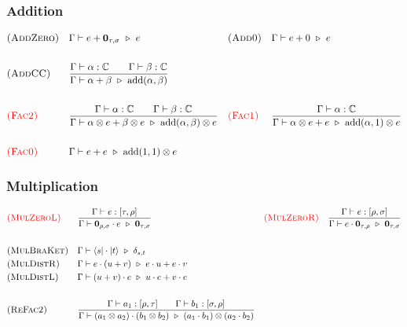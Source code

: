 \subsubsection*{Addition}
\begin{align*}
  & \textsc{(AddZero)} && \Gamma \vdash e + \textbf{0}_{\tau, \sigma} \ \triangleright\  e 
  && \textsc{(Add0)} && \Gamma \vdash e + 0 \ \triangleright\  e\\
  \\
  & \textsc{(AddCC)} && \frac{\Gamma \vdash \alpha : \mathbb{C} \qquad \Gamma \vdash \beta : \mathbb{C}}{\Gamma \vdash \alpha + \beta \ \triangleright\  \mathrm{add}(\alpha, \beta)} \\
  \\
  & \textcolor{red}{\textsc{(Fac2)}} && 
    \frac{\Gamma \vdash \alpha : \mathbb{C} \qquad \Gamma \vdash \beta : \mathbb{C}}
    {\Gamma \vdash \alpha \otimes e + \beta \otimes e \ \triangleright\  \mathrm{add}(\alpha, \beta) \otimes e}
  && \textcolor{red}{\textsc{(Fac1)}} &&
    \frac{\Gamma \vdash \alpha : \mathbb{C}}{\Gamma \vdash \alpha \otimes e + e \ \triangleright\  \mathrm{add}(\alpha, 1) \otimes e} \\
  \\
  & \textcolor{red}{\textsc{(Fac0)}} &&
    \Gamma \vdash e + e \ \triangleright\  \mathrm{add}(1, 1) \otimes e
\end{align*}

\subsubsection*{Multiplication}
\begin{align*}
  & \textcolor{red}{\textsc{(MulZeroL)}}
  && \frac{\Gamma \vdash e : [\tau, \rho]}{\Gamma \vdash \textbf{0}_{\rho, \sigma} \cdot e \ \triangleright\  \textbf{0}_{\tau, \sigma}}
  && \textcolor{red}{\textsc{(MulZeroR)}}
  && \frac{\Gamma \vdash e : [\rho, \sigma]}{\Gamma \vdash e \cdot \textbf{0}_{\tau, \rho} \ \triangleright\  \textbf{0}_{\tau, \sigma}} \\
  \\
  & \textsc{(MulBraKet)} && \Gamma \vdash \langle s| \cdot |t\rangle \ \triangleright\  \delta_{s, t} \\ 
  & \textsc{(MulDistR)} && \Gamma \vdash e \cdot (u + v) \ \triangleright\  e \cdot u + e \cdot v \\
  & \textsc{(MulDistL)} && \Gamma \vdash (u + v) \cdot e \ \triangleright\  u \cdot e + v \cdot e \\
  \\
  & \textsc{(ReFac2)} && \frac{\Gamma \vdash a_1 : [\rho, \tau] \qquad \Gamma \vdash b_1 : [\sigma, \rho]}{\Gamma \vdash (a_1 \otimes a_2) \cdot (b_1 \otimes b_2) \ \triangleright\  (a_1 \cdot b_1) \otimes (a_2 \cdot b_2)} \\
\end{align*}

